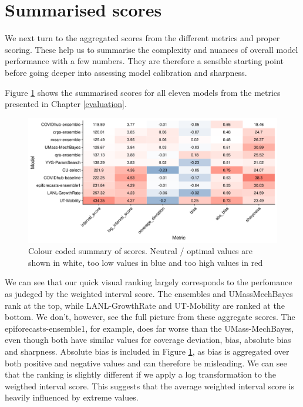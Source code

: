 \documentclass[
]{book}
\begin{document}
\hypertarget{summarised-scores}{%
\section{Summarised scores}\label{summarised-scores}}

We next turn to the aggregated scores from the different metrics and proper scoring. These help us to summarise the complexity and nuances of overall model performance with a few numbers. They are therefore a sensible starting point before going deeper into assessing model calibration and sharpness.

Figure \ref{fig:coloured-summarised-scores} shows the summarised scores for all eleven models from the metrics presented in Chapter \ref{evaluation}.

\begin{figure}
\includegraphics[width=1\linewidth]{../visualisation/chapter-5-results/coloured-summarised-scores} \caption{Colour coded summary of scores. Neutral / optimal values are shown in white, too low values in blue and too high values in red}\label{fig:coloured-summarised-scores}
\end{figure}

We can see that our quick visual ranking largely corresponds to the perfomance as judeged by the weighted interval score. The ensembles and UMassMechBayes rank at the top, while LANL-GrowthRate and UT-Mobility are ranked at the bottom. We don't, however, see the full picture from these aggregate scores. The epiforecasts-ensemble1, for example, does far worse than the UMass-MechBayes, even though both have similar values for coverage deviation, bias, absolute bias and sharpness. Absolute bias is included in Figure \ref{fig:coloured-summarised-scores}, as bias is aggregated over both positive and negative values and can therefore be misleading. We can see that the ranking is slightly different if we apply a log transformation to the weigthed interval score. This suggests that the average weighted interval score is heavily influenced by extreme values.
\end{document}
